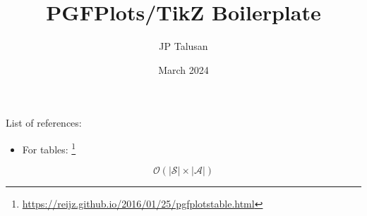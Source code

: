 \documentclass[conference]{IEEEtran}
\title{PGFPlots/TikZ Boilerplate}
\author{JP Talusan}
\date{March 2024}
\DeclareMathOperator*{\argmaxA}{arg\,max} %
\DeclareMathOperator*{\maxA}{max} %
\begin{document}
\maketitle

List of references:
\begin{itemize}
    \item For tables: \footnote{\url{https://reijz.github.io/2016/01/25/pgfplotstable.html}}
\end{itemize}


































\begin{equation}
    \mathcal{O}(|\mathcal{S}| \times |\mathcal{A}|)
\end{equation}


% 










\end{document}
